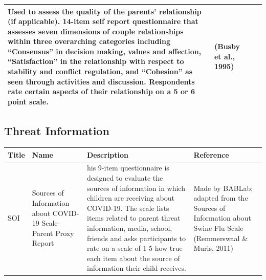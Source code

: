 \documentclass[]{book}
\begin{document}
\begin{longtable}[]{@{}llll@{}}
\begin{minipage}[t]{0.32\columnwidth}
Used to assess the quality of the parents' relationship (if applicable). 14-item self report questionnaire that assesses seven dimensions of couple relationships within three overarching categories including ``Consensus'' in decision making, values and affection, ``Satisfaction'' in the relationship with respect to stability and conflict regulation, and ``Cohesion'' as seen through activities and discussion. Respondents rate certain aspects of their relationship on a 5 or 6 point scale.\strut
\end{minipage} & \begin{minipage}[t]{0.25\columnwidth}\raggedright
(Busby et al., 1995)\strut
\end{minipage}\tabularnewline
\bottomrule
\end{longtable}

\hypertarget{threat-information}{%
\subsection{Threat Information}\label{threat-information}}

\begin{longtable}[]{@{}llll@{}}
\toprule
\begin{minipage}[b]{0.14\columnwidth}\raggedright
Title\strut
\end{minipage} & \begin{minipage}[b]{0.23\columnwidth}\raggedright
Name\strut
\end{minipage} & \begin{minipage}[b]{0.27\columnwidth}\raggedright
Description\strut
\end{minipage} & \begin{minipage}[b]{0.25\columnwidth}\raggedright
Reference\strut
\end{minipage}\tabularnewline
\midrule
\endhead
\begin{minipage}[t]{0.14\columnwidth}\raggedright
SOI\strut
\end{minipage} & \begin{minipage}[t]{0.23\columnwidth}\raggedright
Sources of Information about COVID-19 Scale- Parent Proxy Report\strut
\end{minipage} & \begin{minipage}[t]{0.27\columnwidth}\raggedright
his 9-item questionnaire is designed to evaluate the sources of information in which children are receiving about COVID-19. The scale lists items related to parent threat information, media, school, friends and asks participants to rate on a scale of 1-5 how true each item about the source of information their child receives.\strut
\end{minipage} & \begin{minipage}[t]{0.25\columnwidth}\raggedright
Made by BABLab; adapted from the Sources of Information about Swine Flu Scale (Remmerswaal \& Muris, 2011)\strut
\end{minipage}\tabularnewline
\bottomrule
\end{longtable}
\end{document}

